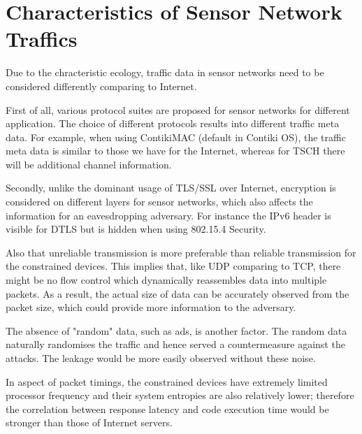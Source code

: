 \section{Characteristics of Sensor Network Traffics}

Due to the chracteristic ecology, traffic data in sensor networks need to be considered differently comparing to Internet.


First of all, various protocol suites are proposed for sensor networks for different application. The choice of different protocols results into different traffic meta data. For example, when using ContikiMAC\cite{ContikiMAC} (default in Contiki OS), the traffic meta data is similar to those we have for the Internet, whereas for TSCH\cite{rfc7554} there will be additional channel information. 
	
Secondly, unlike the dominant usage of TLS/SSL over Internet, encryption is considered on different layers for sensor networks, which also affects the information for an eavesdropping adversary. For instance the IPv6 header is visible for DTLS\cite{rfc6347} but is hidden when using 802.15.4 Security\cite{802154}.

Also that unreliable transmission is more preferable than reliable transmission for the constrained devices. This implies that, like UDP comparing to TCP, there might be no flow control which dynamically reassembles data into multiple packets. As a result, the actual size of data can be accurately observed from the packet size, which could provide more information to the adversary.

The absence of "random" data, such as ads, is another factor. The random data naturally randomises the traffic and hence served a countermeasure against the attacks. The leakage would be more easily observed without these noise.

In aspect of packet timings, the constrained devices have extremely limited processor frequency and their system entropies are also relatively lower; therefore the correlation between response latency and code execution time would be stronger than those of Internet servers.

 



